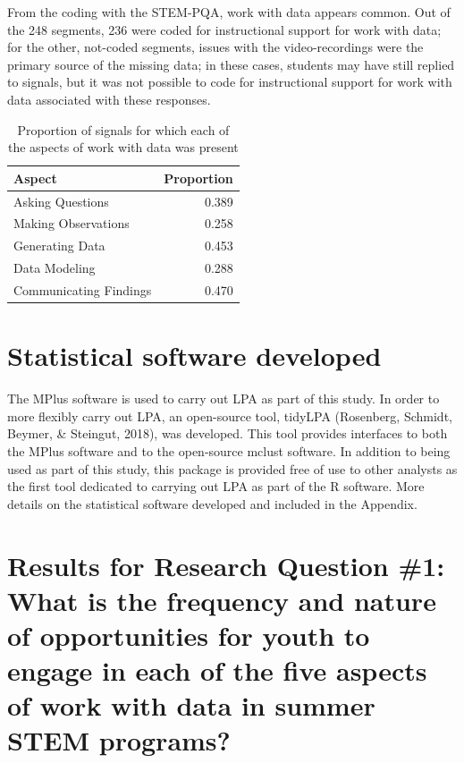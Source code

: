 \documentclass[]{book}
\theoremstyle{definition}
\theoremstyle{definition}
\theoremstyle{definition}
\theoremstyle{remark}
\begin{document}
From the coding with the STEM-PQA, work with data appears common. Out of
the 248 segments, 236 were coded for instructional support for work with
data; for the other, not-coded segments, issues with the
video-recordings were the primary source of the missing data; in these
cases, students may have still replied to signals, but it was not
possible to code for instructional support for work with data associated
with these responses.

\begin{table}

\caption{\label{tab:unnamed-chunk-11}Proportion of signals for which each of the aspects of work with data was present}
\centering
\begin{tabular}[t]{lr}
\toprule
Aspect & Proportion\\
\midrule
Asking Questions & 0.389\\
Making Observations & 0.258\\
Generating Data & 0.453\\
Data Modeling & 0.288\\
Communicating Findings & 0.470\\
\bottomrule
\end{tabular}
\end{table}

\section{Statistical software
developed}\label{statistical-software-developed}

The MPlus software is used to carry out LPA as part of this study. In
order to more flexibly carry out LPA, an open-source tool, tidyLPA
(Rosenberg, Schmidt, Beymer, \& Steingut, 2018), was developed. This
tool provides interfaces to both the MPlus software and to the
open-source mclust software. In addition to being used as part of this
study, this package is provided free of use to other analysts as the
first tool dedicated to carrying out LPA as part of the R software. More
details on the statistical software developed and included in the
Appendix.

\section{Results for Research Question \#1: What is the frequency and
nature of opportunities for youth to engage in each of the five aspects
of work with data in summer STEM
programs?}\label{results-for-research-question-1-what-is-the-frequency-and-nature-of-opportunities-for-youth-to-engage-in-each-of-the-five-aspects-of-work-with-data-in-summer-stem-programs}
\end{document}
